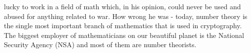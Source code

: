 lucky to work in a field of math which, in his opinion, could never be used and abused for anything related to war. How wrong he was - today, number theory is the single most important branch of mathematics that is used in cryptography. The biggest employer of mathematicians on our beautiful planet is the National Security Agency (NSA) and most of them are number theorists.






